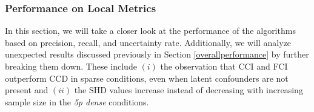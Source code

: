 \documentclass[twoside, 11pt]{article}
\newcommand*{\figref}[2][]{%
  \hyperref[{fig:#2}]{%
    Figure~\ref*{fig:#2}%
    \ifx\\#1\\%
    \else
      #1%
    \fi
  }%
}
\begin{document}






\subsubsection{Performance on Local Metrics} \label{performance-detail}
In this section, we will take a closer look at the performance of the algorithms based on precision, recall, and uncertainty rate.
Additionally, we will analyze unexpected results discussed previously in Section \ref{overallperformance} by further breaking them down. These include $(i)$ the observation that CCI and FCI outperform CCD in sparse conditions, even when latent confounders are not present and $(ii)$ the SHD values increase instead of decreasing with increasing sample size in the \textit{5p dense} conditions.
\end{document}
